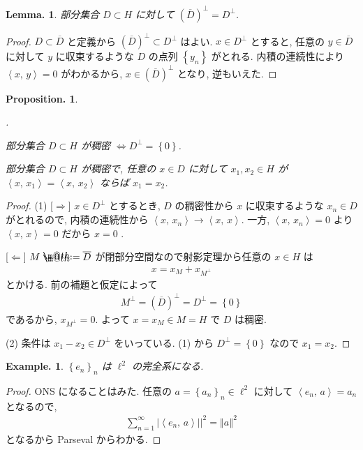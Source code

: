 \documentclass[openany, a4paper, oneside]{jsbook}
\makeatletter
\newcounter{enum2}
\renewenvironment{enumerate}{%
\begin{list}%
{%
\arabic{enum2}.\ \,%
}%
{%
\usecounter{enum2}
\setlength{\itemindent}{0pt}%
\setlength{\leftmargin}{15pt}%
\setlength{\rightmargin}{0pt}%
\setlength{\labelsep}{0pt}%
\setlength{\labelwidth}{6pt}%
\setlength{\itemsep}{0pt}%
\setlength{\parsep}{0pt}%
\setlength{\listparindent}{0pt}%
}
}{%
\end{list}%
}
\newcommand*{\defeq}{\mathrel{\rlap{%
\raisebox{0.3ex}{$\m@th\cdot$}}%
\raisebox{-0.3ex}{$\m@th\cdot$}}%
=}
\theoremstyle{break}
\theoremstyle{breakdefn}
\newtheorem{lem}[thm]{Lemma.}
\newtheorem{prop}[thm]{Proposition.}
\newtheorem{ex}[thm]{Example.}
\newcommand{\abs}[1]{\left|#1\right|}
\newcommand{\norm}[1]{\left\Vert#1\right\Vert}
\newcommand{\rbk}[1]{\left (#1\right)}
\newcommand{\cbk}[1]{\left\{#1\right\}}
\newcommand{\bkt}[2]{\left\langle#1,\,#2\right\rangle}
\makeatother
\begin{document}
\begin{lem}
 部分集合 $D \subset H$ に対して $(\overline{D})^\perp = D^\perp$.
\end{lem}
\begin{proof}
$D \subset \overline{D}$ と定義から $(\overline{D})^\perp \subset D^\perp$ はよい.
$x \in D^\perp$ とすると, 任意の $y \in \overline{D}$ に対して $y$ に収束するような $D$ の点列 $\cbk{y_n}$ がとれる.
内積の連続性により $\bkt{x}{y} = 0$ がわかるから,
$x \in (\overline{D})^\perp$ となり, 逆もいえた.
\end{proof}

\begin{prop}
\begin{enumerate}
\item 部分集合 $D \subset H$ が稠密 $\Longleftrightarrow D^\perp = \cbk{0}$.
\item 部分集合 $D \subset H$ が稠密で, 任意の $x \in D$ に対して $x_{1}, x_{2} \in H$ が
    $\bkt{x}{x_1} = \bkt{x}{x_2}$ ならば $x_{1} = x_{2}$.
\end{enumerate}
\end{prop}
\begin{proof}
(1) [$\Longrightarrow$]
$x \in D^\perp$ とするとき, $D$ の稠密性から $x$ に収束するような $x_{n} \in D$ がとれるので,
内積の連続性から $\bkt{x}{x_n} \to \bkt{x}{x}$.
一方, $\bkt{x}{x_n} = 0$ より $\bkt{x}{x} = 0$ だから $x = 0$ .

[$\Longleftarrow$]
$M \defeq \overline{D}$ が閉部分空間なので射影定理から任意の $x \in H$ は
\begin{align}
 x
 =
 x_{M} + x_{M^\perp}
\end{align}
とかける.
前の補題と仮定によって
\begin{align}
 M^\perp
 = \rbk{\overline{D}}^\perp
 =
 D^\perp
 =
 \cbk{0}
\end{align}
であるから, $x_{M^\perp} = 0$.
よって $x = x_{M} \in M = H$ で $D$ は稠密.

(2) 条件は $x_1 - x_2 \in D^\perp$ をいっている.
(1) から $D^\perp = \cbk{0}$ なので $x_1 = x_2$.
\end{proof}

\begin{ex}
 $\cbk{e_n}_n$ は $\ell^2$ の完全系になる.
\end{ex}
\begin{proof}
ONS になることはみた.
任意の $a = \cbk{a_{n}}_n \in \ell^2$ に対して $\bkt{e_n}{a} = a_n$ となるので,
\begin{align}
 \sum_{n=1}^\infty \abs{\bkt{e_n}{a}}|^2
 =
 \norm{a}^2
\end{align}
となるから Parseval からわかる.
\end{proof}
\end{document}
